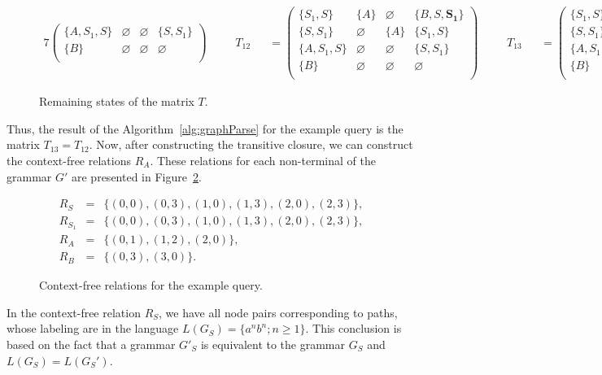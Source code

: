 \begin{figure}[ht]
\begin{alignat*}{7}
\begin{pmatrix}
\{A, S_1, S\}  & \varnothing & \varnothing & \{S, S_1\} \\
\{B\}       & \varnothing & \varnothing & \varnothing \\
\end{pmatrix} \ \ \ \ &&T_{12} &&= \begin{pmatrix}
\{S_1, S\}     & \{A\}       & \varnothing & \{B, S, \pmb{S_1}\}    \\
\{S, S_1\}       & \varnothing & \{A\}       & \{S_1, S\}     \\
\{A, S_1, S\}  & \varnothing & \varnothing & \{S, S_1\} \\
\{B\}       & \varnothing & \varnothing & \varnothing \\
\end{pmatrix} \ \ \ \ &&T_{13} &&= \begin{pmatrix}
\{S_1, S\}     & \{A\}       & \varnothing & \{B, S, S_1\}    \\
\{S, S_1\}       & \varnothing & \{A\}       & \{S_1, S\}     \\
\{A, S_1, S\}  & \varnothing & \varnothing & \{S, S_1\} \\
\{B\}       & \varnothing & \varnothing & \varnothing \\
\end{pmatrix}
\end{alignat*}
\caption{Remaining states of the matrix $T$.}
\label{ExampleQueryFinalIterations}
\end{figure}

Thus, the result of the Algorithm~\ref{alg:graphParse} for the example query is the matrix $T_13 = T_12$. Now, after constructing the transitive closure, we can construct the context-free relations $R_A$. These relations for each non-terminal of the grammar $G'$ are presented in Figure~\ref{ExampleQueryCFRelations}.

\begin{figure}[h]
\begin{eqnarray*}
R_S&=&\{(0,0),(0,3),(1,0),(1,3),(2,0),(2,3)\},\\
R_{S_1}&=&\{(0,0),(0,3),(1,0),(1,3),(2,0),(2,3)\},\\
R_{A}&=&\{(0,1),(1,2),(2,0)\}, \\
R_{B}&=&\{(0,3), (3,0)\}.
\end{eqnarray*}
\caption{Context-free relations for the example query.}
\label{ExampleQueryCFRelations}
\end{figure}

In the context-free relation $R_S$, we have all node pairs corresponding to paths, whose labeling are in the language $L(G_S) = \{a^n b^n; n \geq 1\}$. This conclusion is based on the fact that a grammar $G'_S$ is equivalent to the grammar $G_S$ and $L(G_S) = L(G_S')$.

